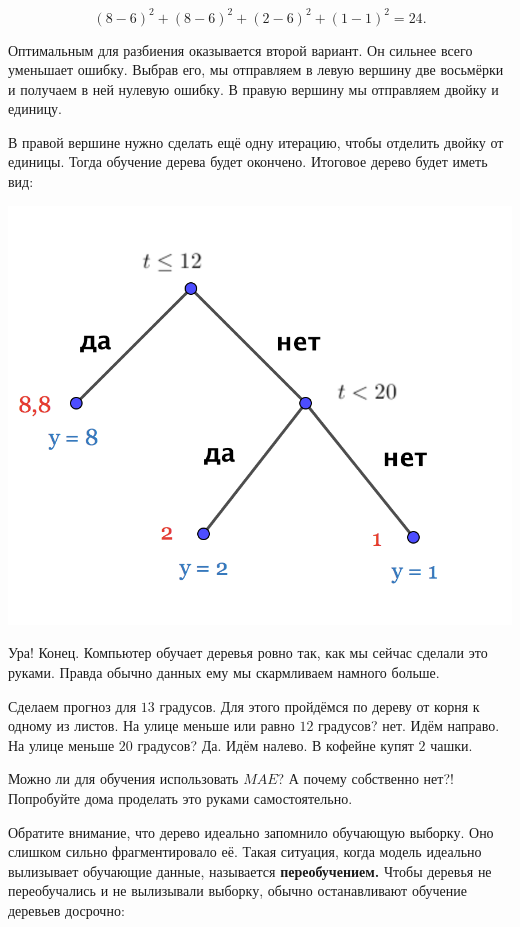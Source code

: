 \documentclass[12pt, a4paper, oneside]{article}
\theoremstyle{plain} %
\theoremstyle{definition}
\newcommand{\indef}[1]{\textbf{ \color{green} #1}}
\begin{document}
\begin{solution}
\begin{itemize}
   $$ 
   (8 - 6)^2 + (8 - 6)^2 + (2 - 6)^2 + (1 - 1)^2 = 24.
   $$
\end{itemize}
	
Оптимальным для разбиения оказывается второй вариант. Он сильнее всего уменьшает ошибку.  Выбрав его, мы отправляем в левую вершину две восьмёрки и получаем в ней нулевую ошибку. В правую вершину мы отправляем двойку и единицу. 
	
В правой вершине нужно сделать ещё одну итерацию, чтобы отделить двойку от единицы. Тогда обучение дерева будет окончено. Итоговое дерево будет иметь вид: 
	
\begin{center}
	\includegraphics[scale=0.23]{reg_tree_2.png}
\end{center}

Ура! Конец. Компьютер обучает деревья ровно так, как мы сейчас сделали это руками. Правда обычно данных ему мы скармливаем намного больше. 
	
Сделаем прогноз для $13$ градусов.  Для этого пройдёмся по дереву от корня к одному из листов. На улице меньше или равно $12$ градусов?  нет. Идём направо. На улице меньше $20$ градусов? Да. Идём налево. В кофейне купят $2$ чашки. 

Можно ли для обучения использовать $MAE$? А почему собственно нет?! Попробуйте дома проделать это руками самостоятельно.

Обратите внимание, что дерево идеально запомнило обучающую выборку. Оно слишком сильно фрагментировало её. Такая ситуация, когда модель идеально вылизывает обучающие данные, называется \indef{переобучением.} Чтобы деревья не переобучались и не вылизывали выборку, обычно останавливают обучение деревьев досрочно: 
	

\end{solution}
\end{document}
